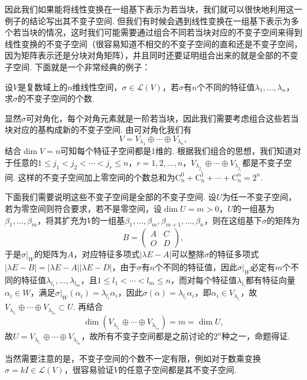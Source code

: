 因此我们如果能将线性变换在一组基下表示为若当块，我们就可以很快地利用这一例子的结论写出其不变子空间. 但我们有时候会遇到线性变换在一组基下表示为多个若当块的情况，这时我们可能需要通过组合不同若当块对应的不变子空间来得到线性变换的不变子空间（很容易知道不相交的不变子空间的直和还是不变子空间，因为矩阵表示还是分块对角矩阵），并且同时还要证明组合出来的就是全部的不变子空间. 下面就是一个非常经典的例子：
\begin{example}
    设$V$是复数域上的$n$维线性空间，$\sigma\in\mathcal{L}(V)$，若$\sigma$有$n$个不同的特征值$\lambda_1,\ldots,\lambda_n$，求$\sigma$的不变子空间的个数.
\end{example}
\begin{solution}
    显然$\sigma$可对角化，每个对角元素就是一阶若当块，因此我们需要考虑组合这些若当块对应的基构成新的不变子空间. 由可对角化我们有
    \[V=V_{\lambda_1}\oplus\cdots\oplus V_{\lambda_n},\]
    结合$\dim V=n$可知每个特征子空间都是1维的. 根据我们组合的思想，我们知道对于任意的$1\leqslant j_1<j_2<\cdots<j_r\leqslant n$，$r=1,2,\ldots,n$，$V_{\lambda_{j_1}}\oplus\cdots\oplus V_{\lambda_{j_r}}$都是不变子空间. 这样的不变子空间加上零空间的个数总和为$\mathrm{C}_n^0+\mathrm{C}_n^1+\cdots+\mathrm{C}_n^n=2^n$.

    下面我们需要说明这些不变子空间是全部的不变子空间. 设$U$为任一不变子空间，若为零空间则符合要求，若不是零空间，设$\dim U=m>0$，$U$的一组基为$\beta_1,\ldots,\beta_m$，将其扩充为$V$的一组基$\beta_1,\ldots,\beta_m,\beta_{m+1},\ldots,\beta_n$，则在这组基下$\sigma$的矩阵为
    \[B=\begin{pmatrix}
        A & C \\ O & D
    \end{pmatrix},\]
    于是$\sigma\vert_W$的矩阵为$A$，对应特征多项式$|\lambda E-A|$可以整除$\sigma$的特征多项式$|\lambda E-B|=|\lambda E-A||\lambda E-D|$，由于$\sigma$有$n$个不同的特征值，因此$\sigma\vert_W$必定有$m$个不同的特征值$\lambda_{l_1},\ldots,\lambda_{l_m}$，且$1\leqslant l_1<\cdots<l_m\leqslant n$，而对每个特征值$\lambda_{l_i}$都有特征向量$\alpha_i\in W$，满足$\sigma\vert_W(\alpha_i)=\lambda_{l_i}\alpha_i$，因此$\sigma(\alpha)=\lambda_{l_i}\alpha_i$，即$\alpha_i\in V_{\lambda_{l_i}}$，故$V_{\lambda_{l_1}}\oplus\cdots\oplus V_{\lambda_{l_m}}\subset U$. 再结合
    \[\dim(V_{\lambda_{l_1}}\oplus\cdots\oplus V_{\lambda_{l_m}})=m=\dim U,\]
    故$U=V_{\lambda_{l_1}}\oplus\cdots\oplus V_{\lambda_{l_m}}$，故所有不变子空间都是之前讨论的$2^n$种之一，命题得证.
\end{solution}

当然需要注意的是，不变子空间的个数不一定有限，例如对于数乘变换$\sigma=kI\in\mathcal{L}(V)$，很容易验证$V$的任意子空间都是其不变子空间.


